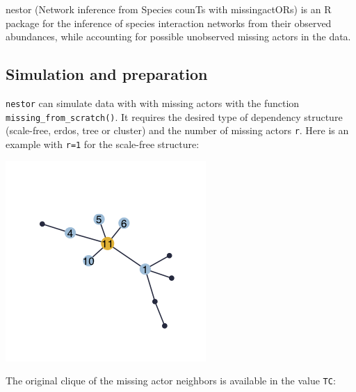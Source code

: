 

nestor (Network inference from Species counTs with missingactORs) is an R package for the inference of species interaction networks from their observed abundances, while accounting for possible unobserved missing actors in the data.

\subsection{Simulation and preparation}\label{simulation-and-preparation}

\texttt{nestor} can simulate data with with missing actors with the
function \texttt{missing\_from\_scratch()}. It requires the desired type
of dependency structure (scale-free, erdos, tree or cluster) and the
number of missing actors \texttt{r}. Here is an example with
\texttt{r=1} for the scale-free structure:

\begin{Shaded}
\begin{Highlighting}[]
\NormalTok{, }\NormalTok{)}
\end{Highlighting}
\end{Shaded}

\begin{center}\includegraphics[width=0.3\linewidth]{nestorArticle/man/figures/README-unnamed-chunk-2-1} \end{center}

The original clique of the missing actor neighbors is available in the
value \texttt{TC}:

\begin{Shaded}
\begin{Highlighting}[]
\OperatorTok{\$}
\CommentTok{#> [[1]]}
\end{Highlighting}
\end{Shaded}

